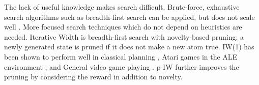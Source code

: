 \documentclass{book}
\begin{document}
The lack of useful knowledge  makes search difficult.
Brute-force, exhaustive search algorithms such as breadth-first search %
can be applied, but does not scale well \cite{Bellemare2013}. 
More focused search techniques which do not depend on heuristics are needed. %
Iterative Width \cite{Lipovetzky2015a} is breadth-first search with novelty-based pruning: a newly generated state is pruned if it does not make a new atom true. IW(1) has been shown to perform well in classical planning \cite{LipovetzkyG12}, Atari games in the ALE environment \cite{Lipovetzky2015a}, and General video game playing \cite{Geffner2015}.
p-IW \cite{ShleyfmanTD16} further improves the pruning by considering the reward in addition to novelty.

\begin{comment}
\section{Multiple Sequence Alignment}
工事中

\section{Model Checking}
工事中

\end{comment}


\begin{comment}
\chapter{関連分野}
\subsection{ゲーム木探索}
工事中

\section{制約充足問題}
工事中

\end{comment}





\end{document}
